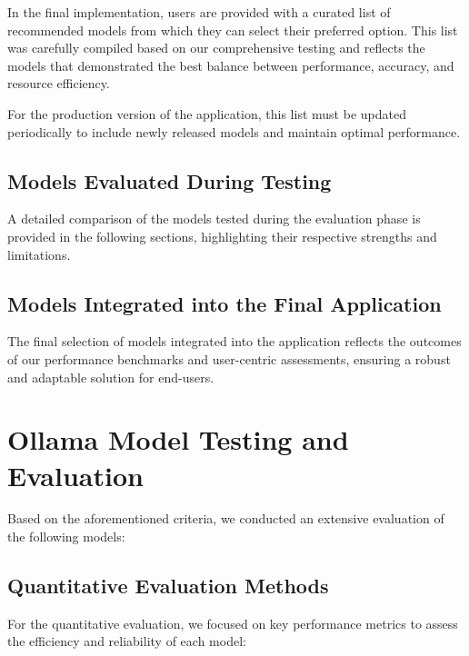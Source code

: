 In the final implementation, users are provided with a curated list of recommended models from which they can select their preferred option. 
This list was carefully compiled based on our comprehensive testing and reflects the models that demonstrated 
the best balance between performance, accuracy, and resource efficiency.

For the production version of the application, 
this list must be updated periodically to include newly released models and maintain optimal performance.

\subsection{Models Evaluated During Testing}

A detailed comparison of the models tested during the evaluation phase is provided in the following sections, 
highlighting their respective strengths and limitations.

\subsection{Models Integrated into the Final Application}

The final selection of models integrated into the application reflects the outcomes of our performance benchmarks and user-centric assessments, 
ensuring a robust and adaptable solution for end-users.


\section{Ollama Model Testing and Evaluation}

Based on the aforementioned criteria, we conducted an extensive evaluation of the following models:

\subsection{Quantitative Evaluation Methods}

For the quantitative evaluation, we focused on key performance metrics to assess the efficiency and reliability of each model:

